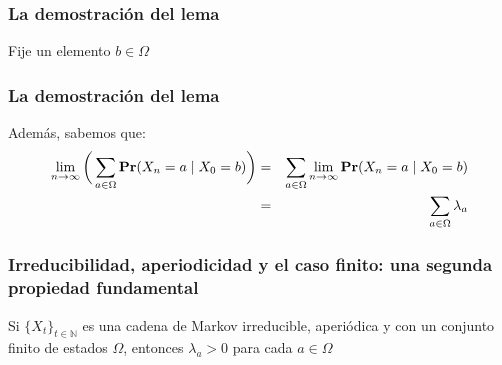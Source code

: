 \begin{frame}
\frametitle{La demostración del lema}

{\small

Fije un elemento $b \in \Omega$





}

\end{frame}



\begin{frame}
\frametitle{La demostración del lema}

{\small

Además, sabemos que:
\begin{eqnarray*}
\lim_{n \to \infty} \bigg(\sum_{a \in \Omega} {\rm {\bf Pr}}(X_n = a \mid X_0 = b)\bigg) & = & 
\sum_{a \in \Omega} \lim_{n \to \infty} {\rm {\bf Pr}}(X_n = a \mid X_0 = b)\\ & = & \sum_{a \in \Omega} \lambda_a
\end{eqnarray*}





}
\end{frame}

\begin{frame}
\frametitle{Irreducibilidad, aperiodicidad y el caso finito: una segunda propiedad fundamental}

{\small

\begin{lema}
Si $\{ X_t \}_{t \in \mathbb{N}}$ es una cadena de Markov irreducible, aperiódica y con un conjunto finito de estados $\Omega$, entonces $\lambda_a > 0$ para cada $a \in \Omega$
\end{lema}



}

\end{frame}


